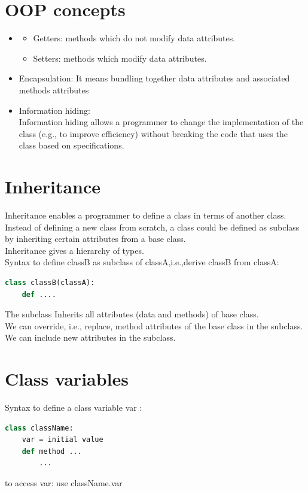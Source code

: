 \documentclass[12pt,oneside]{book}
\begin{document}
\section{OOP concepts}
\begin{itemize}
	\item \begin{itemize}
		      \item Getters: methods which do not modify data attributes.
		      \item Setters: methods which modify data attributes.
	      \end{itemize}
	\item Encapsulation: It means bundling together data attributes and associated methods attributes
	\item Information hiding:\\
	      Information hiding allows a programmer to change the implementation of the class (e.g., to improve efficiency) without breaking the code that uses the class based on specifications.
\end{itemize}
\section{Inheritance}
Inheritance enables a programmer to define a class in terms of another class.\\
Instead of defining a new class from scratch, a class could be defined as subclass by inheriting certain attributes from a base class.\\
Inheritance gives a hierarchy of types.\\

Syntax to define classB as subclass of classA,i.e.,derive classB from classA:
{\small\begin{lstlisting}[language=python]
class classB(classA):
	def ....
\end{lstlisting}}
The subclass Inherits all attributes (data and methods) of base class.\\
We can override, i.e., replace, method attributes of the base class in the subclass.\\
We can include new attributes in the subclass.
\section{Class variables}
Syntax to define a class variable var :
{\small\begin{lstlisting}[language=python]
class className:
	var = initial value 
	def method ... 
		...
\end{lstlisting}}
to access var: use className.var
\end{document}
